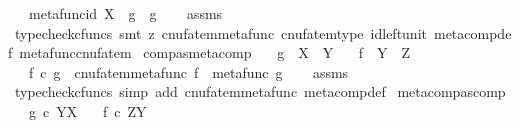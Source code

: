 \begin{isabellebody}
\ \ \ {\isachardoublequoteopen}metafunc{\isacharparenleft}{\kern0pt}id\ X{\isacharparenright}{\kern0pt}\ {\isasymbox}\ g\ {\isacharequal}{\kern0pt}\ g{\isachardoublequoteclose}\isanewline
%
\isadelimproof
\ \ %
\endisadelimproof
%
\isatagproof
{}\isamarkupfalse%
\ assms\ \isamarkupfalse%
\ {\isacharparenleft}{\kern0pt}typecheck{\isacharunderscore}{\kern0pt}cfuncs{\isacharcomma}{\kern0pt}\ smt\ {\isacharparenleft}{\kern0pt}z{}{\isacharparenright}{\kern0pt}\ cnufatem{\isacharunderscore}{\kern0pt}metafunc\ cnufatem{\isacharunderscore}{\kern0pt}type\ id{\isacharunderscore}{\kern0pt}left{\isacharunderscore}{\kern0pt}unit{}\ meta{\isacharunderscore}{\kern0pt}comp{}{\isacharunderscore}{\kern0pt}def{}\ metafunc{\isacharunderscore}{\kern0pt}cnufatem{\isacharparenright}{\kern0pt}%
\endisatagproof
{\isafoldproof}%
%
\isadelimproof
\isanewline
%
\endisadelimproof
\isanewline
{}\isamarkupfalse%
\ comp{\isacharunderscore}{\kern0pt}as{\isacharunderscore}{\kern0pt}metacomp{\isacharcolon}{\kern0pt}\isanewline
\ \ \ {\isachardoublequoteopen}g\ {\isacharcolon}{\kern0pt}\ X\ {\isasymrightarrow}\ Y{\isachardoublequoteclose}\isanewline
\ \ \ {\isachardoublequoteopen}f\ {\isacharcolon}{\kern0pt}\ Y\ {\isasymrightarrow}\ Z{\isachardoublequoteclose}\isanewline
\ \ \ {\isachardoublequoteopen}f\ {\isasymcirc}\isactrlsub c\ g\ {\isacharequal}{\kern0pt}\ cnufatem{\isacharparenleft}{\kern0pt}metafunc\ f\ {\isasymbox}\ metafunc\ g{\isacharparenright}{\kern0pt}{\isachardoublequoteclose}\isanewline
%
\isadelimproof
\ \ %
\endisadelimproof
%
\isatagproof
{}\isamarkupfalse%
\ assms\ \isamarkupfalse%
\ {\isacharparenleft}{\kern0pt}typecheck{\isacharunderscore}{\kern0pt}cfuncs{\isacharcomma}{\kern0pt}\ simp\ add{\isacharcolon}{\kern0pt}\ cnufatem{\isacharunderscore}{\kern0pt}metafunc\ meta{\isacharunderscore}{\kern0pt}comp{}{\isacharunderscore}{\kern0pt}def{}{\isacharparenright}{\kern0pt}%
\endisatagproof
{\isafoldproof}%
%
\isadelimproof
\isanewline
%
\endisadelimproof
\isanewline
{}\isamarkupfalse%
\ metacomp{\isacharunderscore}{\kern0pt}as{\isacharunderscore}{\kern0pt}comp{\isacharcolon}{\kern0pt}\isanewline
\ \ \ {\isachardoublequoteopen}g\ {\isasymin}\isactrlsub c\ Y\isactrlbsup X\isactrlesup {\isachardoublequoteclose}\isanewline
\ \ \ {\isachardoublequoteopen}f\ {\isasymin}\isactrlsub c\ Z\isactrlbsup Y\isactrlesup {\isachardoublequoteclose}\isanewline

\end{isabellebody}
